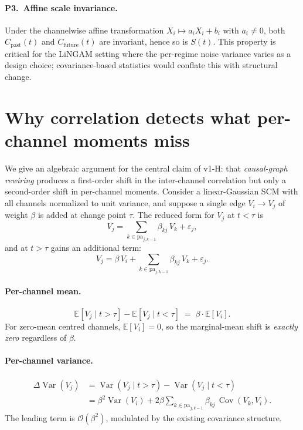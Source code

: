 \documentclass[11pt,a4paper]{article}
\newcommand{\Var}{\operatorname{Var}}
\newcommand{\Cov}{\operatorname{Cov}}
\newcommand{\E}{\mathbb{E}}
\begin{document}
\paragraph{P3.\ Affine scale invariance.}
Under the channelwise affine transformation $X_i \mapsto a_i X_i + b_i$
with $a_i \ne 0$, both $C_{\text{past}}(t)$ and $C_{\text{future}}(t)$ are
invariant, hence so is $S(t)$. This property is critical for the LiNGAM
setting where the per-regime noise variance varies as a design choice;
covariance-based statistics would conflate this with structural change.

\section{Why correlation detects what per-channel moments miss}

We give an algebraic argument for the central claim of v1-H: that
\emph{causal-graph rewiring} produces a first-order shift in the
inter-channel correlation but only a second-order shift in per-channel
moments. Consider a linear-Gaussian SCM with all channels normalized to
unit variance, and suppose a single edge $V_i \to V_j$ of weight $\beta$
is added at change point $\tau$. The reduced form for $V_j$ at $t < \tau$ is
\begin{equation}
V_j = \sum_{k \in \mathrm{pa}_{j,k-1}} \beta_{kj}\, V_k + \varepsilon_j,
\end{equation}
and at $t > \tau$ gains an additional term:
\begin{equation}
V_j = \beta\, V_i + \sum_{k \in \mathrm{pa}_{j,k-1}} \beta_{kj}\, V_k + \varepsilon_j.
\end{equation}

\paragraph{Per-channel mean.}
\begin{equation}
\E[V_j \mid t > \tau] - \E[V_j \mid t < \tau] \;=\; \beta \cdot \E[V_i].
\end{equation}
For zero-mean centred channels, $\E[V_i] = 0$, so the marginal-mean shift is
\emph{exactly zero} regardless of $\beta$.

\paragraph{Per-channel variance.}
\begin{align}
\Delta \Var(V_j)
&= \Var(V_j \mid t > \tau) - \Var(V_j \mid t < \tau) \nonumber \\
&= \beta^2 \Var(V_i) + 2\beta \sum_{k \in \mathrm{pa}_{j,k-1}} \beta_{kj}\,\Cov(V_k, V_i).
\end{align}
The leading term is $\mathcal{O}(\beta^2)$, modulated by the existing
covariance structure.
\end{document}
